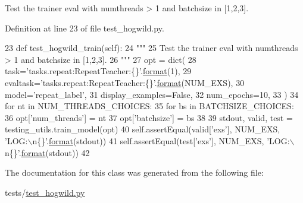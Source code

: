\begin{DoxyVerb}Test the trainer eval with numthreads > 1 and batchsize in [1,2,3].
\end{DoxyVerb}
 

Definition at line 23 of file test\+\_\+hogwild.\+py.


\begin{DoxyCode}
23     \textcolor{keyword}{def }test\_hogwild\_train(self):
24         \textcolor{stringliteral}{"""}
25 \textcolor{stringliteral}{        Test the trainer eval with numthreads > 1 and batchsize in [1,2,3].}
26 \textcolor{stringliteral}{        """}
27         opt = dict(
28             task=\textcolor{stringliteral}{'tasks.repeat:RepeatTeacher:\{\}'}.\hyperlink{namespaceparlai_1_1chat__service_1_1services_1_1messenger_1_1shared__utils_a32e2e2022b824fbaf80c747160b52a76}{format}(1),
29             evaltask=\textcolor{stringliteral}{'tasks.repeat:RepeatTeacher:\{\}'}.\hyperlink{namespaceparlai_1_1chat__service_1_1services_1_1messenger_1_1shared__utils_a32e2e2022b824fbaf80c747160b52a76}{format}(NUM\_EXS),
30             model=\textcolor{stringliteral}{'repeat\_label'},
31             display\_examples=\textcolor{keyword}{False},
32             num\_epochs=10,
33         )
34         \textcolor{keywordflow}{for} nt \textcolor{keywordflow}{in} NUM\_THREADS\_CHOICES:
35             \textcolor{keywordflow}{for} bs \textcolor{keywordflow}{in} BATCHSIZE\_CHOICES:
36                 opt[\textcolor{stringliteral}{'num\_threads'}] = nt
37                 opt[\textcolor{stringliteral}{'batchsize'}] = bs
38 
39                 stdout, valid, test = testing\_utils.train\_model(opt)
40                 self.assertEqual(valid[\textcolor{stringliteral}{'exs'}], NUM\_EXS, \textcolor{stringliteral}{'LOG:\(\backslash\)n\{\}'}.\hyperlink{namespaceparlai_1_1chat__service_1_1services_1_1messenger_1_1shared__utils_a32e2e2022b824fbaf80c747160b52a76}{format}(stdout))
41                 self.assertEqual(test[\textcolor{stringliteral}{'exs'}], NUM\_EXS, \textcolor{stringliteral}{'LOG:\(\backslash\)n\{\}'}.\hyperlink{namespaceparlai_1_1chat__service_1_1services_1_1messenger_1_1shared__utils_a32e2e2022b824fbaf80c747160b52a76}{format}(stdout))
42 
\end{DoxyCode}


The documentation for this class was generated from the following file\+:\begin{DoxyCompactItemize}
\item 
tests/\hyperlink{test__hogwild_8py}{test\+\_\+hogwild.\+py}\end{DoxyCompactItemize}
